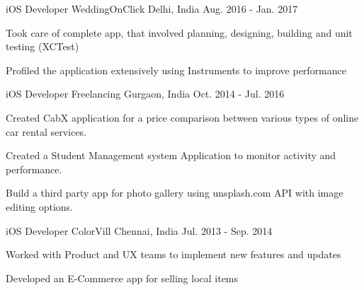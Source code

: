 \begin{cventries}

\cventry
{iOS Developer} %
{WeddingOnClick} %
{Delhi, India} %
{Aug. 2016 - Jan. 2017} %
{ %
\begin{cvitems}
\item {Took care of complete app, that involved planning, designing, building and unit testing (XCTest)}
\item {Profiled the application extensively using Instruments to improve performance}
\end{cvitems}
}



\cventry
{iOS Developer} %
{Freelancing} %
{Gurgaon, India} %
{Oct. 2014 - Jul. 2016} %
{ %
\begin{cvitems}
\item {Created CabX application for a price comparison between various types of online car rental services.}
\item {Created a Student Management system Application to monitor activity and performance.}
\item {Build a third party app for photo gallery using unsplash.com API with image editing options.}
\end{cvitems}
}


\cventry
{iOS Developer} %
{ColorVill} %
{Chennai, India} %
{Jul. 2013 - Sep. 2014} %
{ %
\begin{cvitems}
\item {Worked with Product and UX teams to implement new features and updates}
\item {Developed an E-Commerce app for selling local items }
\end{cvitems}
}


\end{cventries}